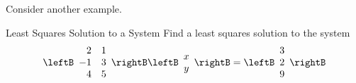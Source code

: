 Consider another example. 

\begin{example}{Least Squares Solution to a System}
Find a least squares solution to the system 
\begin{equation*}
\leftB
\begin{array}{rr}
2 & 1 \\ 
-1 & 3 \\ 
4 & 5
\end{array}
\rightB \leftB 
\begin{array}{c}
x \\ 
y
\end{array}
\rightB =\leftB 
\begin{array}{c}
3 \\ 
2 \\ 
9
\end{array}
\rightB
\end{equation*}
\end{example}

